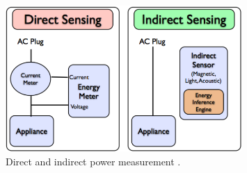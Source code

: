 \begin{figure}
\centering
\includegraphics[width=0.8\textwidth]{./chapters/chapter1/images/direct_indirect_sensing.pdf} 
\caption{Direct and indirect power measurement \cite{Kim09Ubicomp}.} 
\label{fig:I3} 
\end{figure}






